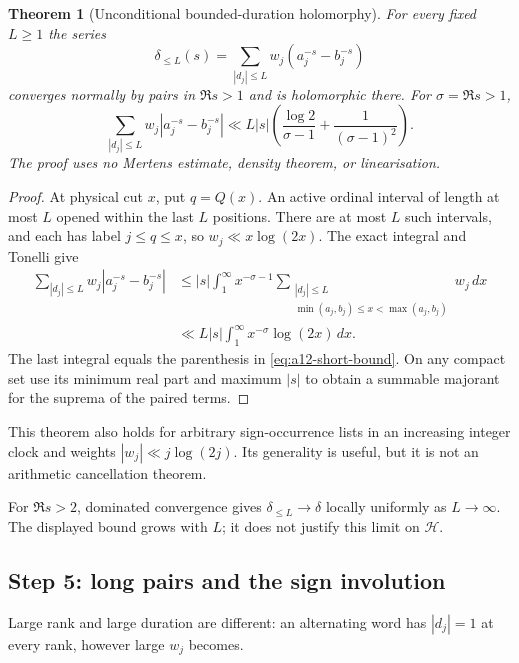 \documentclass[11pt]{amsart}
\numberwithin{equation}{section}
\theoremstyle{plain}
\newtheorem{theorem}{Theorem}[section]
\theoremstyle{definition}
\theoremstyle{remark}
\begin{document}
\begin{theorem}[Unconditional bounded-duration holomorphy]
\label{thm:a12-short}
For every fixed $L\ge1$ the series
\begin{equation}
\label{eq:a12-short}
\delta_{\le L}(s)=\sum_{|d_j|\le L}w_j(a_j^{-s}-b_j^{-s})
\end{equation}
converges normally by pairs in $\Re s>1$ and is holomorphic there.
For $\sigma=\Re s>1$,
\begin{equation}
\label{eq:a12-short-bound}
\sum_{|d_j|\le L}w_j|a_j^{-s}-b_j^{-s}|
\ll L|s|\left(\frac{\log2}{\sigma-1}+\frac1{(\sigma-1)^2}\right).
\end{equation}
The proof uses no Mertens estimate, density theorem, or linearisation.
\end{theorem}
\begin{proof}
At physical cut $x$, put $q=Q(x)$. An active ordinal interval of length
at most $L$ opened within the last $L$ positions. There are at most $L$
such intervals, and each has label $j\le q\le x$, so
$w_j\ll x\log(2x)$. The exact integral and Tonelli give
\begin{align}
\sum_{|d_j|\le L}w_j|a_j^{-s}-b_j^{-s}|
&\le |s|\int_1^\infty x^{-\sigma-1}
\sum_{\substack{|d_j|\le L\\\min(a_j,b_j)\le x<\max(a_j,b_j)}}w_j\,dx
\label{eq:a12-short-majorant}\\
&\ll L|s|\int_1^\infty x^{-\sigma}\log(2x)\,dx.
\nonumber
\end{align}
The last integral equals the parenthesis in \eqref{eq:a12-short-bound}.
On any compact set use its minimum real part and maximum $|s|$ to obtain
a summable majorant for the suprema of the paired terms.
\end{proof}

This theorem also holds for arbitrary sign-occurrence lists in an
increasing integer clock and weights $|w_j|\ll j\log(2j)$.
Its generality is useful, but it is not an arithmetic cancellation theorem.

For $\Re s>2$, dominated convergence gives
$\delta_{\le L}\to\delta$ locally uniformly as $L\to\infty$.
The displayed bound grows with $L$; it does not justify this limit on
$\mathcal H$.

\subsection{Step 5: long pairs and the sign involution}
\label{subsec:a12-long-pairs}
Large rank and large duration are different: an alternating word has
$|d_j|=1$ at every rank, however large $w_j$ becomes.
\end{document}
